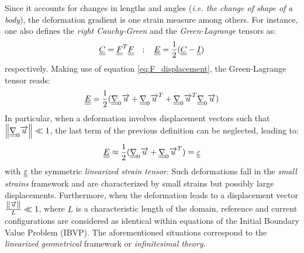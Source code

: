 Since it accounts for changes in lengths and angles (\textit{i.e. the change of shape of a body}), the deformation gradient is one strain measure among others. For instance, one also defines the \textit{right Cauchy-Green} and the \textit{Green-Lagrange} tensors as:
\begin{equation*}
  {\underline{\underline{C}}}={\underline{\underline{F}}}^T{\underline{\underline{F}}} \quad ; \quad {\underline{\underline{E}}}=\frac{1}{2}({\underline{\underline{C}}}-{\underline{\underline{I}}})
\end{equation*}
respectively. Making use of equation \eqref{eq:F_displacement}, the Green-Lagrange tensor reads:
\begin{equation*}
  {\underline{\underline{E}}}=\frac{1}{2}({\underline{\underline{\nabla}}}_0 {\overrightarrow{u}} + {\underline{\underline{\nabla}}}_0 {\overrightarrow{u}}^T + {\underline{\underline{\nabla}}}_0 {\overrightarrow{u}}^T {\underline{\underline{\nabla}}}_0 {\overrightarrow{u}})
\end{equation*}
In particular, when a deformation involves displacement vectors such that $\left\Vert{\underline{\underline{\nabla}}}_0 {\overrightarrow{u}}\right\Vert \ll 1$, the last term of the previous definition can be neglected, leading to:
\begin{equation}
  \label{eq:epsilon}
  {\underline{\underline{E}}} \approx \frac{1}{2}({\underline{\underline{\nabla}}}_0 {\overrightarrow{u}} + {\underline{\underline{\nabla}}}_0 {\overrightarrow{u}}^T) = {\underline{\underline{\varepsilon}}}
\end{equation}
with ${\underline{\underline{\varepsilon}}}$ the symmetric \textit{linearized strain tensor}. Such deformations fall in the \textit{small strains} framework and are characterized by small strains but possibly large displacements. Furthermore, when the deformation leads to a displacement vector $\frac{\left\Vert{\overrightarrow{u}}\right\Vert}{L} \ll 1$, where $L$ is a characteristic length of the domain, reference and current configurations are considered as identical within equations of the Initial Boundary Value Problem (IBVP). The aforementioned situations correspond to the \textit{linearized geometrical} framework  or \textit{infinitesimal theory}.

